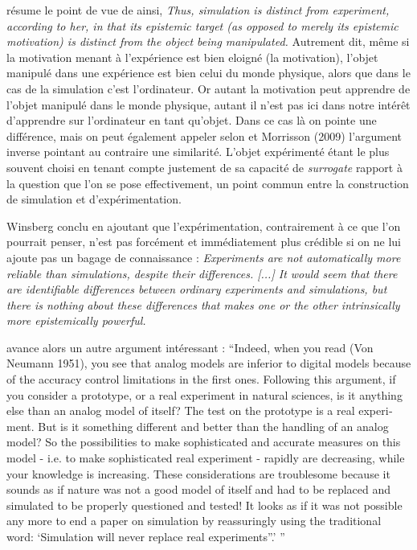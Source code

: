 \textcite{Winsberg2013} résume le point de vue de \autocite{Peschard2010} ainsi, \textit{Thus, simulation is distinct from experiment, according to her, in that its epistemic target (as opposed to merely its epistemic motivation) is distinct from the object being manipulated.} Autrement dit, même si la motivation menant à l'expérience est bien eloigné (la motivation), l'objet manipulé dans une expérience est bien celui du monde physique, alors que dans le cas de la simulation c'est l'ordinateur. Or autant la motivation peut apprendre de l'objet manipulé dans le monde physique, autant il n'est pas ici dans notre intérêt d'apprendre sur l'ordinateur en tant qu'objet. Dans ce cas là on pointe une différence, mais on peut également appeler selon \textcite{Winsberg2013} et Morrisson (2009) l'argument inverse pointant au contraire une similarité. L'objet expérimenté étant le plus souvent choisi en tenant compte justement de sa capacité de \textit{surrogate} rapport à la question que l'on se pose effectivement, un point commun entre la construction de simulation et d'expérimentation. 

Winsberg conclu en ajoutant que l'expérimentation, contrairement à ce que l'on pourrait penser, n'est pas forcément et immédiatement plus crédible si on ne lui ajoute pas un bagage de connaissance : \textit{Experiments are not automatically more reliable than simulations, despite their differences. [...] It would seem that there are identifiable differences between ordinary experiments and simulations, but there is nothing about these differences that makes one or the other intrinsically more epistemically powerful.}  \autocites{Winsberg2009, Winsberg2013}

\textcite{Varenne2001} avance alors un autre argument intéressant : \foreignquote{english}{Indeed, when you read (Von Neumann 1951), you see that analog models are inferior to digital models because of the accuracy control limitations in the first ones. Following this argument, if you consider a prototype, or a real experiment in natural sciences, is it anything else than an analog model of itself? The test on the prototype is a real experiment. But is it something different and better than the handling of an analog model? So the possibilities to make sophisticated and accurate measures on this model - i.e. to make sophisticated real experiment - rapidly are decreasing, while your knowledge is increasing. These considerations are troublesome because it sounds as if nature was not a good model of itself and had to be replaced and simulated to be properly questioned and tested! It looks as if it was not possible any more to end a paper on simulation by reassuringly using the traditional word: \enquote{Simulation will never replace real experiments”.} }

